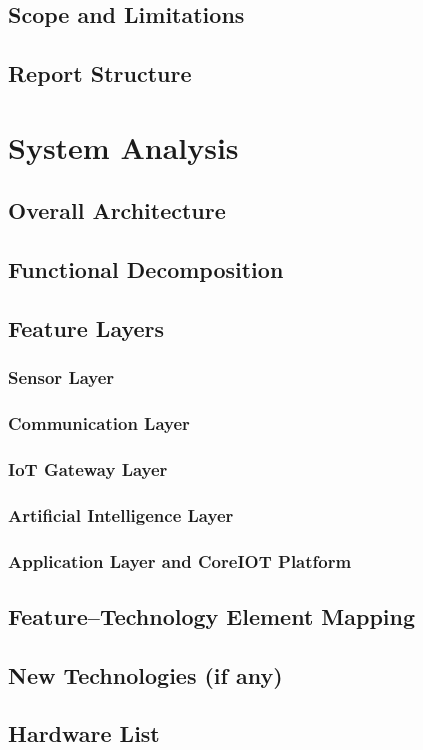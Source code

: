 \documentclass[12pt,a4paper]{report}
\begin{document}
\section{Scope and Limitations}
\section{Report Structure}
\chapter{System Analysis}
\section{Overall Architecture}
\section{Functional Decomposition}
\section{Feature Layers}
\subsection{Sensor Layer}
\subsection{Communication Layer}
\subsection{IoT Gateway Layer}
\subsection{Artificial Intelligence Layer}
\subsection{Application Layer and CoreIOT Platform}
\section{Feature--Technology Element Mapping}
\section{New Technologies (if any)}
\section{Hardware List}
\end{document}
